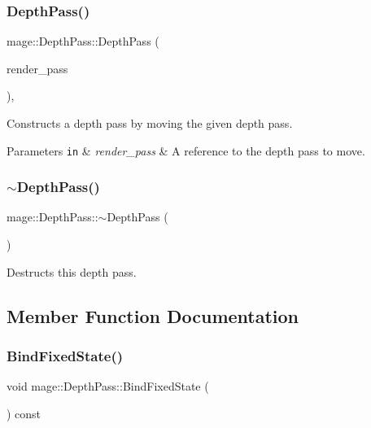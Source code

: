 \subsubsection{\texorpdfstring{Depth\+Pass()}{DepthPass()}\hspace{0.1cm}{\footnotesize\ttfamily [3/3]}}
{\footnotesize\ttfamily mage\+::\+Depth\+Pass\+::\+Depth\+Pass (\begin{DoxyParamCaption}\item[{\hyperlink{classmage_1_1_depth_pass}{Depth\+Pass} \&\&}]{render\+\_\+pass }\end{DoxyParamCaption})\hspace{0.3cm}{\ttfamily [default]}, {\ttfamily [noexcept]}}

Constructs a depth pass by moving the given depth pass.


\begin{DoxyParams}[1]{Parameters}
\mbox{\tt in}  & {\em render\+\_\+pass} & A reference to the depth pass to move. \\
\hline
\end{DoxyParams}
\hypertarget{classmage_1_1_depth_pass_adc89d5da94b42294316d4ad1dfa09eb4}{}\label{classmage_1_1_depth_pass_adc89d5da94b42294316d4ad1dfa09eb4} 
\subsubsection{\texorpdfstring{$\sim$\+Depth\+Pass()}{~DepthPass()}}
{\footnotesize\ttfamily mage\+::\+Depth\+Pass\+::$\sim$\+Depth\+Pass (\begin{DoxyParamCaption}{ }\end{DoxyParamCaption})\hspace{0.3cm}{\ttfamily [default]}}

Destructs this depth pass. 

\subsection{Member Function Documentation}
\hypertarget{classmage_1_1_depth_pass_a9fb46d9ce430864284bb35091855f7ed}{}\label{classmage_1_1_depth_pass_a9fb46d9ce430864284bb35091855f7ed} 
\subsubsection{\texorpdfstring{Bind\+Fixed\+State()}{BindFixedState()}}
{\footnotesize\ttfamily void mage\+::\+Depth\+Pass\+::\+Bind\+Fixed\+State (\begin{DoxyParamCaption}{ }\end{DoxyParamCaption}) const\hspace{0.3cm}{\ttfamily [noexcept]}}


